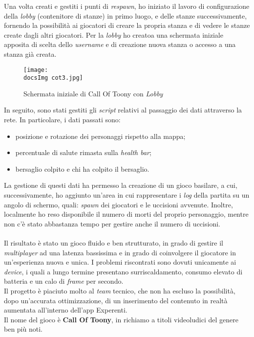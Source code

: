 Una volta creati e gestiti i punti di \textit{respawn}, ho iniziato il lavoro di configurazione della \textit{lobby} (contenitore di stanze) in primo luogo, e delle stanze successivamente, fornendo la possibilit\`a ai giocatori di creare la propria stanza e di vedere le stanze create dagli altri giocatori. Per la \textit{lobby} ho creatoa una schermata iniziale apposita di scelta dello \textit{username} e di creazione nuova stanza o accesso a una stanza gi\`a creata.

\begin{figure}[H]
	\centering
	\texttt{[image: \\docsImg cot3.jpg]}
	\caption{Schermata iniziale di Call Of Toony con \textit{Lobby}}
	\label{fig:Schermata iniziale di Call Of Toony con Lobby}
\end{figure}
\noindent
In seguito, sono stati gestiti gli \textit{script} relativi al passaggio dei dati attraverso la rete. In particolare, i dati passati sono:

\begin{itemize}
	\item posizione e rotazione dei personaggi rispetto alla mappa;
	\item percentuale di salute rimasta sulla \textit{health bar};
	\item bersaglio colpito e chi ha colpito il bersaglio.
\end{itemize}
\newpage
\noindent
La gestione di questi dati ha permesso la creazione di un gioco basilare, a cui, successivamente, ho aggiunto un'area in cui rappresentare i \textit{log} della partita su un angolo di schermo, quali: \textit{spawn} dei giocatori e le uccisioni avvenute. Inoltre, localmente ho reso disponibile il numero di morti del proprio personaggio, mentre non c'\`e stato abbastanza tempo per gestire anche il numero di uccisioni.\\\\
Il risultato \`e stato un gioco fluido e ben strutturato, in grado di gestire il \textit{multiplayer} ad una latenza bassissima e in grado di coinvolgere il giocatore in un'esperienza nuova e unica. I problemi riscontrati sono dovuti unicamente ai \textit{device}, i quali a lungo termine presentano surriscaldamento, consumo elevato di batteria e un calo di \textit{frame} per secondo.\\
Il progetto \`e piaciuto molto al \textit{team} tecnico, che non ha escluso la possibilit\`a, dopo un'accurata ottimizzazione, di un inserimento del contenuto in realt\`a aumentata all'interno dell'app Experenti.\\
Il nome del gioco \`e \textbf{Call Of Toony}, in richiamo a titoli videoludici del genere ben pi\`u noti.

